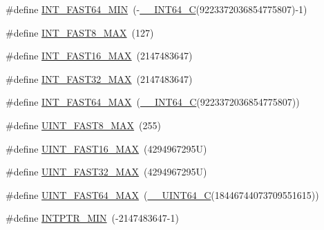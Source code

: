 \begin{DoxyCompactItemize}
\item 
\#define \hyperlink{win_2_l_a_d_s_p_a__plugins-win_2glibc__includes_2stdint_8h_a50f0fdcb00ea2500cec0f3d6d45c36f3}{I\+N\+T\+\_\+\+F\+A\+S\+T64\+\_\+\+M\+IN}~(-\/\hyperlink{win_2_l_a_d_s_p_a__plugins-win_2glibc__includes_2stdint_8h_a4b8971e411b88166747d2a3c2425eaee}{\+\_\+\+\_\+\+I\+N\+T64\+\_\+C}(9223372036854775807)-\/1)
\item 
\#define \hyperlink{win_2_l_a_d_s_p_a__plugins-win_2glibc__includes_2stdint_8h_acbcdb3bee0f5f904da5df8de69a80ca3}{I\+N\+T\+\_\+\+F\+A\+S\+T8\+\_\+\+M\+AX}~(127)
\item 
\#define \hyperlink{win_2_l_a_d_s_p_a__plugins-win_2glibc__includes_2stdint_8h_a2fd35d0ea091e04caec504ff0042cf00}{I\+N\+T\+\_\+\+F\+A\+S\+T16\+\_\+\+M\+AX}~(2147483647)
\item 
\#define \hyperlink{win_2_l_a_d_s_p_a__plugins-win_2glibc__includes_2stdint_8h_ac96fa0f41b19e89f109e4f9913ca6635}{I\+N\+T\+\_\+\+F\+A\+S\+T32\+\_\+\+M\+AX}~(2147483647)
\item 
\#define \hyperlink{win_2_l_a_d_s_p_a__plugins-win_2glibc__includes_2stdint_8h_a13c95cf9c209d8daacb36cbf0d5ba275}{I\+N\+T\+\_\+\+F\+A\+S\+T64\+\_\+\+M\+AX}~(\hyperlink{win_2_l_a_d_s_p_a__plugins-win_2glibc__includes_2stdint_8h_a4b8971e411b88166747d2a3c2425eaee}{\+\_\+\+\_\+\+I\+N\+T64\+\_\+C}(9223372036854775807))
\item 
\#define \hyperlink{win_2_l_a_d_s_p_a__plugins-win_2glibc__includes_2stdint_8h_a2c6f97ea2d76d0cf6260c84046cdb44e}{U\+I\+N\+T\+\_\+\+F\+A\+S\+T8\+\_\+\+M\+AX}~(255)
\item 
\#define \hyperlink{win_2_l_a_d_s_p_a__plugins-win_2glibc__includes_2stdint_8h_aed28ca63d9b222f6f1377358fe73a183}{U\+I\+N\+T\+\_\+\+F\+A\+S\+T16\+\_\+\+M\+AX}~(4294967295\+U)
\item 
\#define \hyperlink{win_2_l_a_d_s_p_a__plugins-win_2glibc__includes_2stdint_8h_ad51246a178143208b2db3315efd21c45}{U\+I\+N\+T\+\_\+\+F\+A\+S\+T32\+\_\+\+M\+AX}~(4294967295\+U)
\item 
\#define \hyperlink{win_2_l_a_d_s_p_a__plugins-win_2glibc__includes_2stdint_8h_aeb74410af7781bc84b5f64ae7a8f4a17}{U\+I\+N\+T\+\_\+\+F\+A\+S\+T64\+\_\+\+M\+AX}~(\hyperlink{win_2_l_a_d_s_p_a__plugins-win_2glibc__includes_2stdint_8h_a405cee4934ed56c9a4aa4e7dc4380bd2}{\+\_\+\+\_\+\+U\+I\+N\+T64\+\_\+C}(18446744073709551615))
\item 
\#define \hyperlink{win_2_l_a_d_s_p_a__plugins-win_2glibc__includes_2stdint_8h_a2aaa6d3aa1d7d1e0e326955aa24db752}{I\+N\+T\+P\+T\+R\+\_\+\+M\+IN}~(-\/2147483647-\/1)

\end{DoxyCompactItemize}
